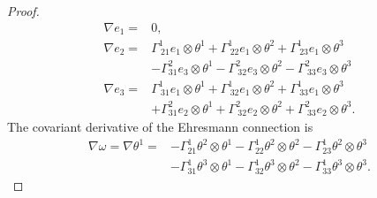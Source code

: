 \documentclass[10pt,a4paper]{amsart}
\begin{document}
\begin{proof}
\begin{equation}
\begin{aligned}
        \nabla e_1 =& 0, \\
        \nabla e_2 =& \Gamma^1_{~21} e_1 \otimes \theta^1 + \Gamma^1_{~22} e_1 \otimes \theta^2 + \Gamma^1_{~23} e_1 \otimes \theta^3 \\ 
        & -\Gamma^2_{31} e_3 \otimes \theta^1 - \Gamma^2_{~32} e_3 \otimes \theta^2 - \Gamma^2_{~33} e_3 \otimes \theta^3 \\
        \nabla e_3 =& \Gamma^1_{~31} e_1 \otimes \theta^1 + \Gamma^1_{~32} e_1 \otimes \theta^2 + \Gamma^1_{~33} e_1 \otimes \theta^3  \\ 
        &+ \Gamma^2_{31} e_2 \otimes \theta^1 + \Gamma^2_{~32} e_2 \otimes \theta^2 + \Gamma^2_{~33} e_2 \otimes \theta^3.
    \end{aligned} \label{eqn:Thm32a} \end{equation}
    \noindent The covariant derivative of the Ehresmann connection is 
    \begin{equation} \begin{aligned}
        \nabla \omega = \nabla \theta^1 =& -\Gamma^1_{21} \theta^2 \otimes \theta^1 - \Gamma^1_{22} \theta^2 \otimes \theta^2 - \Gamma^1_{23} \theta^2 \otimes \theta^3 \\ 
        &- \Gamma^1_{31} \theta^3 \otimes \theta^1 - \Gamma^1_{32} \theta^3 \otimes \theta^2 - \Gamma^1_{33} \theta^3 \otimes \theta^3.  
    \end{aligned} \label{eqn:Thm32b} \end{equation}
    

\end{proof}
\end{document}
